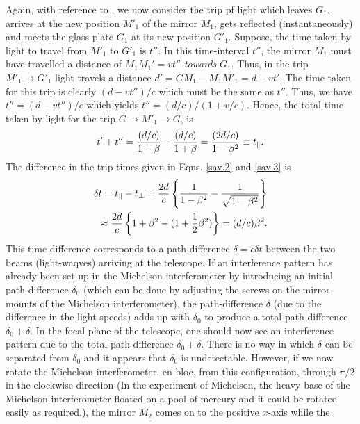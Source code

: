 Again, 
with reference to , we now consider the trip 
pf light which leaves $G_1$, arrives at the new position 
$M'_1$ of the mirror $M_1$, gets reflected (instantaneously) 
and meets the glass plate $G_1$ at its new position $G'_1$. 
Suppose, the time taken by light to travel from $M'_1$ to  
$G'_1$ is $t''$. In this time-interval $t''$, the mirror 
$M_1$ must have travelled a distance of $M_1 M_1' =vt''$ 
\textsl{towards} $G_1$. Thus, in the trip $M'_1 \rightarrow 
G'_1$ light travels a distance $d'=GM_1-M_1M'_1=d-vt'$. The 
time taken for this trip is clearly $(d-vt'')/c$ which must 
be the same as $t''$. Thus, we have $t''=(d-vt'')/c$ which 
yields $t''=(d/c)/(1+v/c)$. Hence, the total time taken by 
light for the trip $G\rightarrow  M'_1\rightarrow G$, is
\begin{align}\label{sav.3}
 t' + t''  = \frac{(d/c)}{1-{\beta}}+  
\frac{(d/c)}{1+{\beta}} = \frac{(2d/c)}{1-\beta^2}\equiv 
t_\parallel.
\end{align}
The difference in the trip-times given in 
Eqns. \eqref{sav.2} and \eqref{sav.3} is
\begin{align}\label{sav.4} 
\delta t= t_\parallel -t_\perp =
\frac{2d}{c}\left\{\frac{1}{1-\beta^2}
-\frac {1} { \sqrt {1-\beta^2}}\right\}\notag \\
\approx
\frac{2d}{c}\left\{1+\beta^2-(1+\frac{1}{2}\beta^2)\right\}
=(d/c) \beta^2.
\end{align}
This time difference corresponds to a path-difference 
$\delta =c \delta t$ between the two beams (light-waqves) 
arriving at the telescope. If an interference  
pattern has already been set up in the Michelson 
interferometer by introducing an initial path-difference 
$\delta_0$ (which can be done by adjusting the screws on 
the mirror-mounts of the Michelson interferometer), the 
path-difference $\delta$ (due to the difference in the 
light speeds) adds up with $\delta_0$ to produce a total 
path-difference $\delta_0+ \delta$. In the focal plane of 
the telescope, one should now see an interference pattern 
due to the total path-difference $\delta_0+ \delta$. There 
is no way in which $\delta$ can be separated from 
$\delta_0$ and it appears that $\delta_0$ is undetectable. 
However, if we now rotate the Michelson interferometer, en 
bloc, from this configuration, through $\pi/2$ in the 
clockwise direction (In the experiment of Michelson, the 
heavy base of the Michelson interferometer floated on a pool 
of mercury and it could be rotated easily as required.),  
the mirror $M_2$ comes on to the positive $x$-axis while the 
